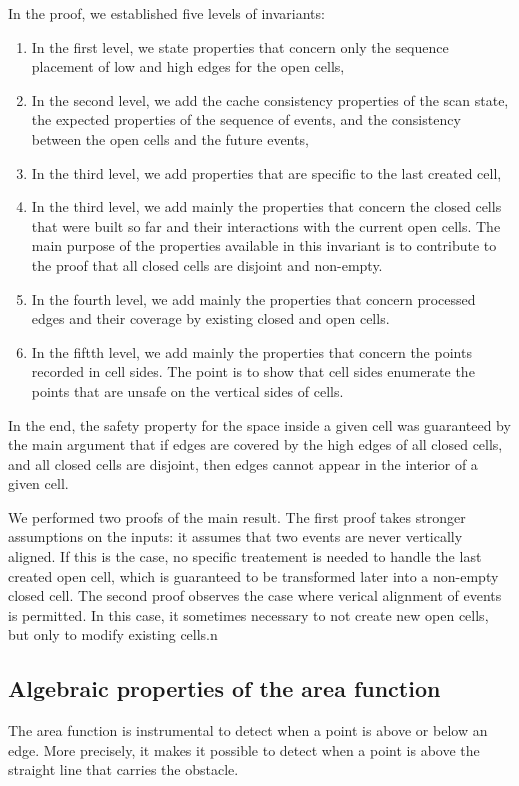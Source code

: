 \documentclass[a4paper, USenglish, cleveref, autoref, thm-restate]{lipics-v2021}
\begin{document}
In the proof, we established five levels of invariants:
\begin{enumerate}
\item In the first level, we state properties that concern only the
sequence placement of low and high edges for the open cells,
\item In the second level, we add the cache consistency properties of
  the scan state, the expected properties of the sequence of events,
  and the consistency between the open cells and the future events,
\item In the third level, we add properties that are specific to the
  last created cell,
\item In the third level, we add mainly the properties that concern
  the closed cells that were built so far and their interactions with
  the current open cells.  The main purpose of the properties
  available in this invariant is to contribute to the proof that
  all closed cells are disjoint and non-empty.
\item In the fourth level, we add mainly the properties that concern
  processed edges and their coverage by existing closed and open
  cells.
\item In the fiftth level, we add mainly the properties that concern
  the points recorded in cell sides.  The point is to show that cell
  sides enumerate the points that are unsafe on the vertical
  sides of cells.
\end{enumerate}
In the end, the safety property for the space inside a given cell was
guaranteed by the main argument that if edges are covered by the high
edges of all closed cells, and all closed cells are disjoint, then
edges cannot appear in the interior of a given cell.

We performed two proofs of the main result.  The first proof takes
stronger assumptions on the inputs: it assumes that two events are
never vertically aligned.  If this is the case, no specific treatement
is needed to handle the last created open cell, which is guaranteed to
be transformed later into a non-empty closed cell.  The second proof
observes the case where verical alignment of events is permitted.  In
this case, it sometimes necessary to not create new open cells, but
only to modify existing cells.n
\subsection{Algebraic properties of the area function}
The area function is instrumental to detect when a point is above or
below an edge.  More precisely, it makes it possible to detect when a
point is above the straight line that carries the obstacle.
\end{document}
